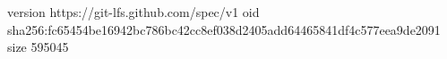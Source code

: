 version https://git-lfs.github.com/spec/v1
oid sha256:fc65454be16942bc786bc42cc8ef038d2405add64465841df4c577eea9de2091
size 595045
